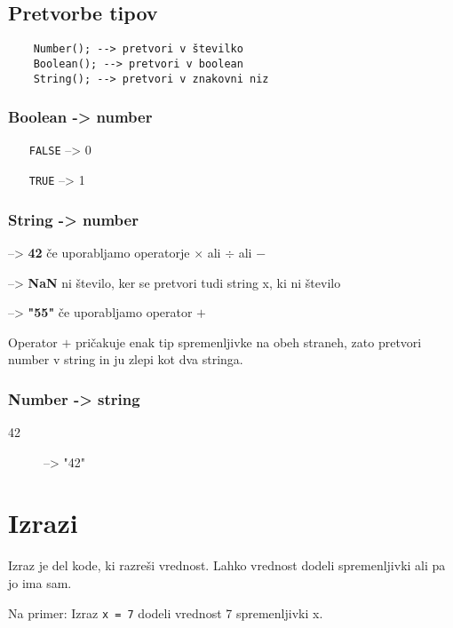\subsection{Pretvorbe tipov}

\begin{verbatim}
	Number(); --> pretvori v številko
	Boolean(); --> pretvori v boolean
	String(); --> pretvori v znakovni niz
\end{verbatim}
\subsubsection*{Boolean -> number}
\begin{itemize}[align=right,labelwidth=3cm]
	\item[\texttt{FALSE}] --> 0
	\item[\texttt{TRUE}] --> 1
\end{itemize}
\subsubsection*{String -> number}
\begin{description}[align=left]
	\item["42"] --> \textbf{42} če uporabljamo operatorje $\times$ ali $\div$ ali $-$	
	\item["5x"] --> \textbf{NaN} ni število, ker se pretvori tudi string x, ki ni število
	\item["5"+5] --> \textbf{"55"} če uporabljamo operator $+$
	\item Operator $+$ pričakuje enak tip spremenljivke na obeh straneh, zato pretvori number v string in ju zlepi kot dva stringa.
\end{description}
\subsubsection*{Number -> string}
\begin{description}
	\item[42] --> "42"
\end{description}

\section{Izrazi}
Izraz je del kode, ki razreši vrednost. Lahko vrednost dodeli spremenljivki ali pa jo ima sam.\

Na primer: Izraz \texttt{x = 7} dodeli vrednost 7 spremenljivki x.\

